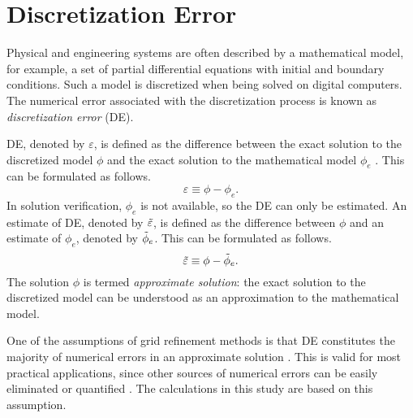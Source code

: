 \section{Discretization Error} \label{sec:DiscErr}
Physical and engineering systems are often described by a mathematical model, for example, a set of partial differential equations with initial and boundary conditions. Such a model is discretized when being solved on digital computers. The numerical error associated with the discretization process is known as \textit{discretization error} (DE).

DE, denoted by $\varepsilon$, is defined as the difference between the exact solution to the discretized model $\phi$ and the exact solution to the mathematical model $\phi_{e}$ \citep{Roy2010}. This can be formulated as follows.
\begin{equation} \label{eq:DE}
    \varepsilon \equiv \phi - \phi_{e}.
\end{equation}
In solution verification, $\phi_{e}$ is not available, so the DE can only be estimated. An estimate of DE, denoted by $\Tilde{\varepsilon}$, is defined as the difference between $\phi$ and an estimate of $\phi_{e}$, denoted by $\Tilde{\phi}_{e}$. This can be formulated as follows.
\begin{equation} \label{eq:est_DE}
    \Tilde{\varepsilon} \equiv \phi - \Tilde{\phi}_{e}.
\end{equation}
The solution $\phi$ is termed \textit{approximate solution}: the exact solution to the discretized model can be understood as an approximation to the mathematical model.

One of the assumptions of grid refinement methods is that DE constitutes the majority of numerical errors in an approximate solution \citep{Roy2010}. This is valid for most practical applications, since other sources of numerical errors can be easily eliminated or quantified \citep{Roy2005,Eca2014AStudies}. The calculations in this study are based on this assumption.

